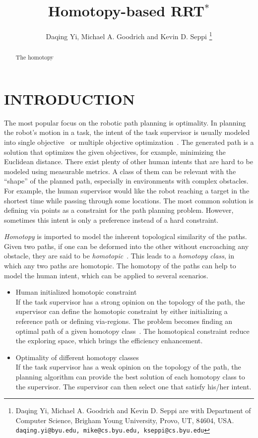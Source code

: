 \documentclass[letterpaper, 10 pt, conference]{ieeeconf}
\title{\LARGE \bf
Homotopy-based RRT$^{*}$
}
\author{
Daqing Yi, Michael A. Goodrich and Kevin D. Seppi
\thanks{Daqing Yi, Michael A. Goodrich and Kevin D. Seppi are with Department of Computer Science, Brigham Young University, Provo, UT, 84604, USA.
{\tt\small daqing.yi@byu.edu, mike@cs.byu.edu, kseppi@cs.byu.edu} }
}
\begin{document}
\maketitle
\thispagestyle{empty}
\pagestyle{empty}


\begin{abstract}
The homotopy 


\end{abstract}


\section{INTRODUCTION}
\label{sec:intro}

The most popular focus on the robotic path planning is optimality.
In planning the robot's motion in a task, the intent of the task supervisor is usually modeled into single objective~\cite{6974170} or multiple objective optimization~\cite{yi2014supporting}.
The generated path is a solution that optimizes the given objectives, for example, minimizing the Euclidean distance.
There exist plenty of other human intents that are hard to be modeled using measurable metrics.
A class of them can be relevant with the ``shape'' of the planned path, especially in environments with complex obstacles.
For example, the human supervisor would like the robot reaching a target in the shortest time while passing through some locations.
The most common solution is defining via points as a constraint for the path planning problem.
However, sometimes this intent is only a preference instead of a hard constraint.

\emph{Homotopy} is imported to model the inherent topological similarity of the paths.
Given two paths, if one can be deformed into the other without encroaching any obstacle, they are said to be \emph{homotopic}~\cite{Hernandez201544}.
This leads to a \emph{homotopy class}, in which any two paths are homotopic.
The homotopy of the paths can help to model the human intent, which can be applied to several scenarios.
\begin{itemize}
\item Human initialized homotopic constraint \\
If the task supervisor has a strong opinion on the topology of the path, the supervisor can define the homotopic constraint by either initializing a reference path or defining via-regions.
The problem becomes finding an optimal path of a given homotopy class~\cite{Hershberger199463}.
The homotopical constraint reduce the exploring space, which brings the efficiency enhancement.
\item Optimality of different homotopy classes \\
If the task supervisor has a weak opinion on the topology of the path, the planning algorithm can provide the best solution of each homotopy class to the supervisor.
The supervisor can then select one that satisfy his/her intent.
\end{itemize}
\end{document}
